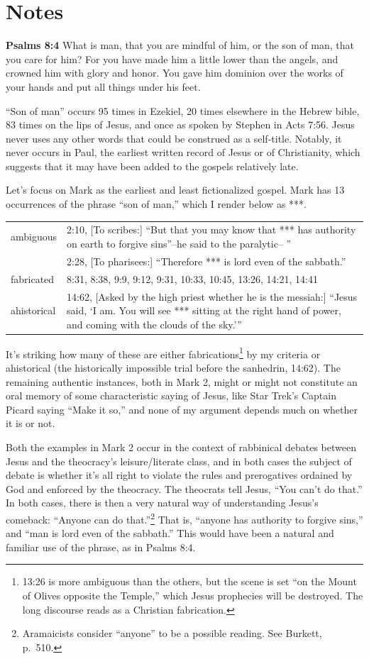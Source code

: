 \documentclass[10pt,a5paper,twoside]{article}
\newcommand{\quotesize}{\normalsize{}}
\newcommand{\maintextquotesize}{\renewcommand{\quotesize}{\large{}}}
\newcommand{\notequotesize}{\renewcommand{\quotesize}{\normalsize{}}}
\newenvironment{quotetext}{\begingroup\quotesize}{\endgroup}
\newcommand{\intex}[1]{\index[texts]{#1}}
\newcommand{\bible}[2]{\begin{quotetext}\textbf{#1}\intex{#1} #2\end{quotetext}}
\DeclareRobustCommand{\stixdangerousbend}{%
  {\usefont{U}{stixbbit}{m}{it}\symbol{"F6}}%
}
\newcommand{\dangerousbend}{\rotatebox[origin=c]{-10}{\stixdangerousbend}}
\newcommand{\link}[2]{\protect\jumplink{anchor-#1}{\textcolor{blue}{#2}}} %
\newcommand{\notewithoutbackref}[1]{\link{note-#1}{\dangerousbend\pageref{note:#1}}}
\newenvironment{notesection}[1]{
  \setcounter{secnumdepth}{0}          %
  \section*{#1}
  \setcounter{secnumdepth}{2}          %
  \notequotesize
}%
{
  \maintextquotesize
}
\begin{document}
\begin{notesection}{Notes}
\bible{Psalms 8:4}{
What is man, that you are mindful of him, or the son of man, that you care for him?
For you have made him a little lower than the angels,
and crowned him with glory and honor.
You gave him dominion over the works of your hands and put all things under his feet.
}

``Son of man'' occurs 95 times in Ezekiel, 20 times elsewhere in the Hebrew bible, 83 times
on the lips of Jesus, and once as spoken by Stephen in Acts 7:56. Jesus never uses any other words that could be construed as a self-title.
Notably, it never occurs in Paul, the earliest
written record of Jesus or of Christianity, which suggests that it may have been added to the gospels relatively late.


Let's focus on Mark  as the earliest and least fictionalized gospel.
Mark has 13 occurrences of the phrase ``son of man,'' which I render below as ***.

\begin{tabular}{lp{70mm}}
ambiguous & 2:10, [To scribes:] ``But that you may know that *** has authority on earth to forgive sins''--he said to the paralytic-- '' \\
          & 2:28, [To pharisees:] ``Therefore *** is lord even of the sabbath.'' \\
fabricated & 8:31, 8:38, 9:9, 9:12, 9:31, 10:33, 10:45, 13:26, 14:21, 14:41 \\
ahistorical & 14:62, [Asked by the high priest whether he is the messiah:]
                 ``Jesus said, `I am. You will see *** sitting at the right hand of power, and coming with the clouds of the sky.'{}''
\end{tabular}

It's striking how many of these are either fabrications\footnote{13:26 is more ambiguous than the others, but the scene is set
``on the Mount of Olives opposite the Temple,'' which Jesus prophecies will be destroyed. The long discourse reads as a Christian
fabrication.} by my criteria \notewithoutbackref{about-this-doc}
or ahistorical (the historically impossible trial before the sanhedrin, 14:62).
The remaining authentic instances, both in Mark 2, might or might not constitute an oral memory
of some characteristic saying of Jesus, like Star Trek's Captain Picard saying ``Make it so,''
and none of my argument depends much on whether it is or not.

Both the examples in Mark 2 occur in the context of rabbinical debates between
Jesus and the theocracy's leisure/literate class, and in both cases the subject of debate is whether it's all
right to violate the rules and prerogatives ordained by God and enforced by the theocracy.
The theocrats tell Jesus, ``You can't do that.''
In both cases, there is then a very natural way of understanding Jesus's comeback: ``Anyone can do that.''\footnote{Aramaicists consider
``anyone'' to be a possible reading. See Burkett, p.~510.}
That is, ``anyone has authority to forgive sins,'' and ``man is lord even of the sabbath.'' This would have been a natural
and familiar use of the phrase, as in Psalms 8:4.


\end{notesection}
\end{document}
